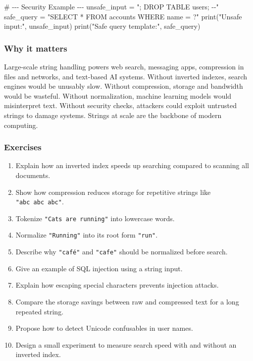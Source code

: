 \documentclass[
  letterpaper,
  DIV=11,
  numbers=noendperiod]{scrreprt}
\newenvironment{Shaded}{\begin{snugshade}}{\end{snugshade}}
\newcommand{\BuiltInTok}[1]{\textcolor[rgb]{0.00,0.23,0.31}{#1}}
\newcommand{\CommentTok}[1]{\textcolor[rgb]{0.37,0.37,0.37}{#1}}
\newcommand{\NormalTok}[1]{\textcolor[rgb]{0.00,0.23,0.31}{#1}}
\newcommand{\OperatorTok}[1]{\textcolor[rgb]{0.37,0.37,0.37}{#1}}
\newcommand{\StringTok}[1]{\textcolor[rgb]{0.13,0.47,0.30}{#1}}
\providecommand{\tightlist}{%
  \setlength{\itemsep}{0pt}\setlength{\parskip}{0pt}}
\begin{document}
\begin{Shaded}
\begin{Highlighting}[]
\CommentTok{\# {-}{-}{-} Security Example {-}{-}{-}}
\NormalTok{unsafe\_input }\OperatorTok{=} \StringTok{"\textquotesingle{}; DROP TABLE users; {-}{-}"}
\NormalTok{safe\_query }\OperatorTok{=} \StringTok{"SELECT * FROM accounts WHERE name = ?"}
\BuiltInTok{print}\NormalTok{(}\StringTok{"Unsafe input:"}\NormalTok{, unsafe\_input)}
\BuiltInTok{print}\NormalTok{(}\StringTok{"Safe query template:"}\NormalTok{, safe\_query)}
\end{Highlighting}
\end{Shaded}

\subsubsection{Why it matters}\label{why-it-matters-44}

Large-scale string handling powers web search, messaging apps,
compression in files and networks, and text-based AI systems. Without
inverted indexes, search engines would be unusably slow. Without
compression, storage and bandwidth would be wasteful. Without
normalization, machine learning models would misinterpret text. Without
security checks, attackers could exploit untrusted strings to damage
systems. Strings at scale are the backbone of modern computing.

\subsubsection{Exercises}\label{exercises-43}

\begin{enumerate}
\def\labelenumi{\arabic{enumi}.}
\tightlist
\item
  Explain how an inverted index speeds up searching compared to scanning
  all documents.
\item
  Show how compression reduces storage for repetitive strings like
  \texttt{"abc\ abc\ abc"}.
\item
  Tokenize \texttt{"Cats\ are\ running"} into lowercase words.
\item
  Normalize \texttt{"Running"} into its root form \texttt{"run"}.
\item
  Describe why \texttt{"café"} and \texttt{"cafe"} should be normalized
  before search.
\item
  Give an example of SQL injection using a string input.
\item
  Explain how escaping special characters prevents injection attacks.
\item
  Compare the storage savings between raw and compressed text for a long
  repeated string.
\item
  Propose how to detect Unicode confusables in user names.
\item
  Design a small experiment to measure search speed with and without an
  inverted index.
\end{enumerate}
\end{document}
